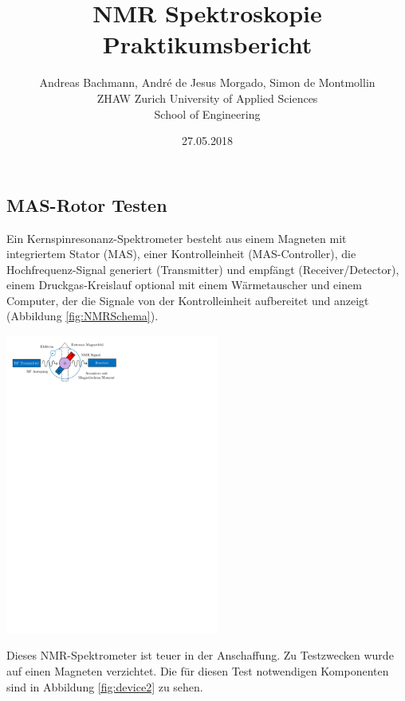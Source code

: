 \documentclass[a4paper]{article}
\title{NMR Spektroskopie Praktikumsbericht}
\author{Andreas Bachmann, André de Jesus Morgado, Simon de Montmollin
	\\
	ZHAW Zurich University of Applied Sciences\\
	School of Engineering
}
\date{27.05.2018}
\newenvironment{Figure}
	{\par\medskip\noindent\minipage{\linewidth}}
	{\endminipage\par\medskip}
\begin{document}
	\maketitle
	
	\begin{multicols*}{2}
		
		\section{MAS-Rotor Testen}
			Ein Kernspinresonanz-Spektrometer besteht aus einem Magneten mit integriertem Stator (MAS), einer
			Kontrolleinheit (MAS-Controller), die Hochfrequenz-Signal generiert (Transmitter) und empfängt (Receiver/Detector),
			einem Druckgas-Kreislauf optional mit einem Wärmetauscher und einem Computer, der die Signale von der
			Kontrolleinheit aufbereitet und anzeigt (Abbildung \ref{fig:NMRSchema}).
			\begin{Figure}
				\centering
				\includegraphics[trim={0.5cm 25cm 9.7cm 0.75cm},clip,width=7cm]{images/NMR_Schema.pdf}
				\label{fig:NMRSchema}
			\end{Figure}
		
			Dieses NMR-Spektrometer ist teuer in der Anschaffung. Zu Testzwecken wurde auf einen Magneten verzichtet.
			Die für diesen Test notwendigen Komponenten sind in Abbildung \ref{fig:device2} zu sehen.
			

\end{multicols*}
\end{document}
